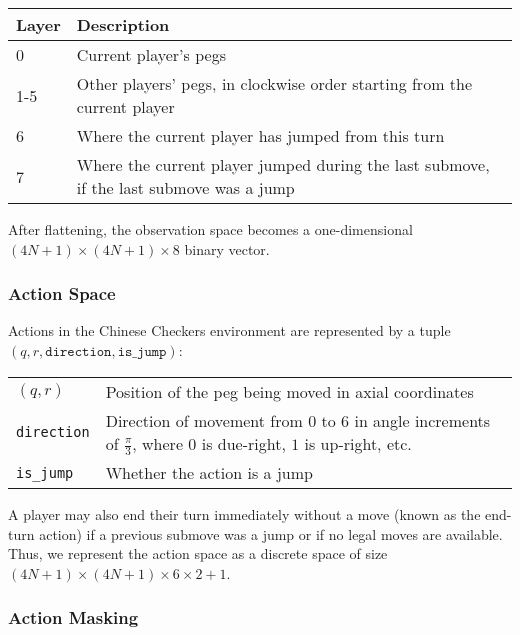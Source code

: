\documentclass[12pt, a4paper, twocolumn]{article}
\begin{document}
\begin{center}
\begin{tabular}{|m{}|m{}|}
  \hline
  Layer & Description \\
  \hline
  0 & Current player's pegs \\
  1-5 & Other players' pegs, in clockwise order starting from the current player \\
  6 & Where the current player has jumped from this turn \\
  7 & Where the current player jumped during the last submove, if the last submove was a jump \\
  \hline
\end{tabular}
\end{center}

After flattening, the observation space becomes a one-dimensional $(4N + 1) \times (4N + 1) \times 8$ binary vector.


\subsubsection{Action Space}

Actions in the Chinese Checkers environment are represented by a tuple $(q, r, \texttt{direction}, \texttt{is\_jump})$:

\begin{center}
  \begin{tabular}{|m{}|m{}|}
    \hline
    $(q, r)$ & Position of the peg being moved in axial coordinates \\
    \texttt{direction} & Direction of movement from $0$ to $6$ in angle increments of $\frac{\pi}{3}$, where $0$ is due-right, $1$ is up-right, etc. \\
    \texttt{is\_jump} & Whether the action is a jump \\
    \hline
  \end{tabular}
  \end{center}

A player may also end their turn immediately without a move (known as the end-turn action) if a previous submove was a jump or if no legal moves are available. Thus, we represent the action space as a discrete space of size $(4N + 1) \times (4N + 1) \times 6 \times 2 + 1$.

\subsubsection{Action Masking}
\end{document}
